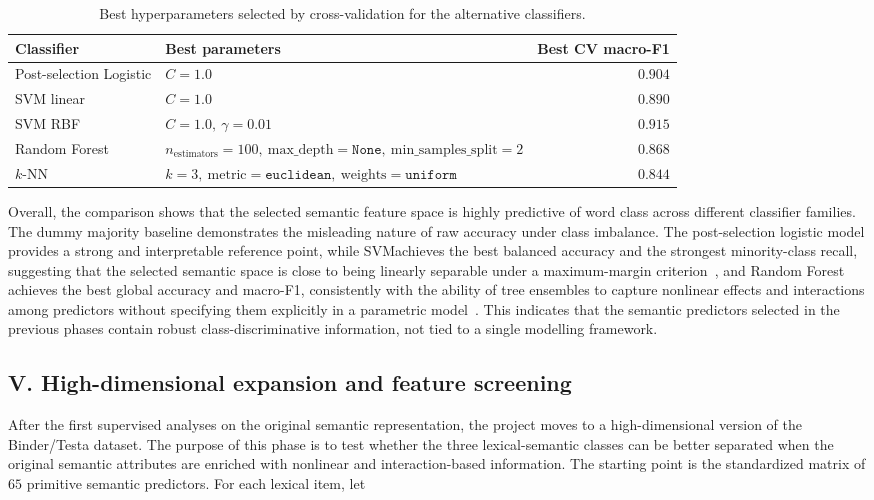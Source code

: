 \documentclass{ipgpmaster}
\begin{document}
\begin{table}[H]
\centering
\small
\begin{tabular}{llr}
\hline
\textbf{Classifier} & \textbf{Best parameters} & \textbf{Best CV macro-F1} \\
\hline
Post-selection Logistic & \(C=1.0\) & \(0.904\) \\
SVM linear & \(C=1.0\) & \(0.890\) \\
SVM RBF & \(C=1.0,\ \gamma=0.01\) & \(0.915\) \\
Random Forest & \(n_{\text{estimators}}=100,\ \text{max\_depth}=\texttt{None},\ \text{min\_samples\_split}=2\) & \(0.868\) \\
\(k\)-NN & \(k=3,\ \text{metric}=\texttt{euclidean},\ \text{weights}=\texttt{uniform}\) & \(0.844\) \\
\hline
\end{tabular}
\caption{Best hyperparameters selected by cross-validation for the alternative classifiers.}
\label{tab:alternative-classifiers-best-params}
\end{table}

Overall, the comparison shows that the selected semantic feature space is highly predictive of word class across different classifier families. The dummy majority baseline demonstrates the misleading nature of raw accuracy under class imbalance. The post-selection logistic model provides a strong and interpretable reference point, while SVMachieves the best balanced accuracy and the strongest minority-class recall, suggesting that the selected semantic space is close to being linearly separable under a maximum-margin criterion~\cite{cortes1995support}, and Random Forest achieves the best global accuracy and macro-F1, consistently with the ability of tree ensembles to capture nonlinear effects and interactions among predictors without specifying them explicitly in a parametric model~\cite{breiman2001random}. This indicates that the semantic predictors selected in the previous phases contain robust class-discriminative information, not tied to a single modelling framework.

\subsection{V. High-dimensional expansion and feature screening}

After the first supervised analyses on the original semantic representation, the project moves to a high-dimensional version of the Binder/Testa dataset. The purpose of this phase is to test whether the three lexical-semantic classes can be better separated when the original semantic attributes are enriched with nonlinear and interaction-based information. The starting point is the standardized matrix of \(65\) primitive semantic predictors. For each lexical item, let
\end{document}
